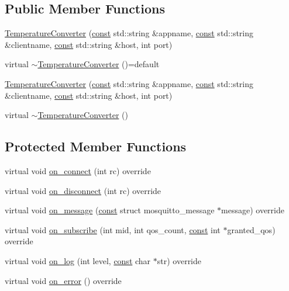 \subsection*{Public Member Functions}
\begin{DoxyCompactItemize}
\item 
\hyperlink{class_temperature_converter_ad34b42abb624d7d4184f6e47dc1ad200}{Temperature\+Converter} (\hyperlink{functions__c_8js_afacfd9c985d225bb07483b887a801b6f}{const} std\+::string \&appname, \hyperlink{functions__c_8js_afacfd9c985d225bb07483b887a801b6f}{const} std\+::string \&clientname, \hyperlink{functions__c_8js_afacfd9c985d225bb07483b887a801b6f}{const} std\+::string \&host, int port)
\item 
virtual \hyperlink{class_temperature_converter_a60e728c5cd240024de4c010e92be8dda}{$\sim$\+Temperature\+Converter} ()=default
\item 
\hyperlink{class_temperature_converter_ad34b42abb624d7d4184f6e47dc1ad200}{Temperature\+Converter} (\hyperlink{functions__c_8js_afacfd9c985d225bb07483b887a801b6f}{const} std\+::string \&appname, \hyperlink{functions__c_8js_afacfd9c985d225bb07483b887a801b6f}{const} std\+::string \&clientname, \hyperlink{functions__c_8js_afacfd9c985d225bb07483b887a801b6f}{const} std\+::string \&host, int port)
\item 
virtual \hyperlink{class_temperature_converter_a4450d027b1c5041e33b4dffb30efb9f1}{$\sim$\+Temperature\+Converter} ()
\end{DoxyCompactItemize}
\subsection*{Protected Member Functions}
\begin{DoxyCompactItemize}
\item 
virtual void \hyperlink{class_temperature_converter_a2873aa81d1480326e797333649ad7612}{on\+\_\+connect} (int rc) override
\item 
virtual void \hyperlink{class_temperature_converter_aed2c87d3bea3cdc71b16932a5deb685a}{on\+\_\+disconnect} (int rc) override
\item 
virtual void \hyperlink{class_temperature_converter_abe798ee6c4861d708fdbf845682a55f4}{on\+\_\+message} (\hyperlink{functions__c_8js_afacfd9c985d225bb07483b887a801b6f}{const} struct mosquitto\+\_\+message $\ast$message) override
\item 
virtual void \hyperlink{class_temperature_converter_a19e82377ed204cd11e63df20368c7c07}{on\+\_\+subscribe} (int mid, int qos\+\_\+count, \hyperlink{functions__c_8js_afacfd9c985d225bb07483b887a801b6f}{const} int $\ast$granted\+\_\+qos) override
\item 
virtual void \hyperlink{class_temperature_converter_a570e3818402e2bbba5d5ecb6529423f3}{on\+\_\+log} (int level, \hyperlink{functions__c_8js_afacfd9c985d225bb07483b887a801b6f}{const} char $\ast$str) override
\item 
virtual void \hyperlink{class_temperature_converter_ac7fc38707aea9dc09145de054c89ffd1}{on\+\_\+error} () override
\end{DoxyCompactItemize}
